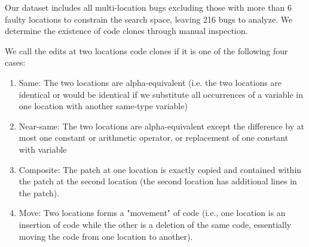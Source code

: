 \documentclass[10pt, conference]{IEEEtran}
\begin{document}
Our dataset includes all multi-location bugs excluding those with more than 6 faulty locations to 
constrain the search space, leaving 216 bugs to analyze. We determine the existence of code 
clones through manual inspection.


We call the edits at two locations code clones if it is one of the following four cases:
\begin{enumerate}
\item Same: The two locations are alpha-equivalent (i.e. the two locations are identical or would be
identical if we substitute all occurrences of a variable in one location with another same-type variable)
\item Near-same: The two locations are alpha-equivalent except the difference by at most one constant or arithmetic operator,
or replacement of one constant with variable
\item Composite: The patch at one location is exactly copied and contained within the patch at 
the 
second location (the second location  has additional lines in the patch).
\item Move: Two locations forms a "movement" of code (i.e., one location is an insertion of 
code 
while the other is a deletion of the same code, essentially moving the code from one location to 
another).
\end{enumerate}
\end{document}
